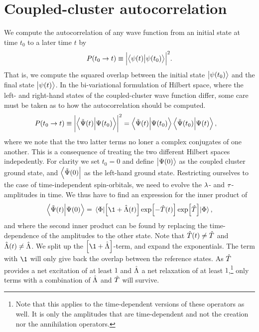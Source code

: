 \chapter{Coupled-cluster autocorrelation}
    \label{app:cc-autocorrelation}
    We compute the autocorrelation of any wave function from an initial state at
    time $t_0$ to a later time $t$ by
    \begin{align}
        P(t_0 \to t)
        \equiv \abs{\braket{\psi(t)}{\psi(t_0)}}^2.
    \end{align}
    That is, we compute the squared overlap between the initial state
    $\ket{\psi(t_0)}$ and the final state $\ket{\psi(t)}$.
    In the bi-variational formulation of Hilbert space, where the left- and
    right-hand states of the coupled-cluster wave function differ, some care
    must be taken as to how the autocorrelation should be computed.
    \begin{align}
        P(t_0 \to t)
        &\equiv \abs{\braket{\tilde{\Psi}(t)}{\Psi(t_0)}}^2
        = \braket{\tilde{\Psi}(t)}{\Psi(t_0)}
        \braket{\tilde{\Psi}(t_0)}{\Psi(t)},
    \end{align}
    where we note that the two latter terms no loner a complex conjugates of one
    another.
    This is a consequence of treating the two different Hilbert spaces
    indepedently.
    For clarity we set $t_0 = 0$ and define $\ket{\Psi(0)}$ as the coupled
    cluster ground state, and $\bra{\tilde{\Psi}(0)}$ as the left-hand ground
    state.
    Restricting ourselves to the case of time-independent spin-orbitals, we need
    to evolve the $\lambda$- and $\tau$-amplitudes in time.
    We thus have to find an expression for the inner product of
    \begin{gather}
        \braket{\tilde{\Psi}(t)}{\Psi(0)}
        =
        \mel{\slat}{
            \brak{\1 + \clustl(t)}
            \exp[-\clust(t)]
            \exp[\clust]
        }{\slat},
    \end{gather}
    and where the second inner product can be found by replacing the
    time-dependence of the amplitudes to the other state.
    Note that $\hat{T}(t) \neq \hat{T}$ and $\hat{\Lambda}(t) \neq \hat{\Lambda}$.
    We split up the $\brak{\1 + \clustl}$-term, and expand the exponentials.
    The term with $\1$ will only give back the overlap between the reference
    states.
    As $\hat{T}$ provides a net excitation of at least $1$ and $\hat{\Lambda}$ a net
    relaxation of at least $1$,\footnote{
        Note that this applies to the time-dependent versions
        of these operators as well. It is only the amplitudes that are
        time-dependent and not the creation nor the annihilation operators.
    } only terms with a combination of $\hat{\Lambda}$ and $\hat{T}$ will survive.
